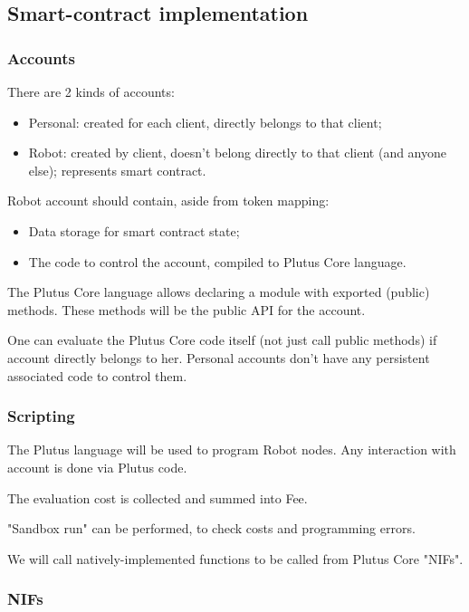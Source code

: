 \subsection{Smart-contract implementation}


\subsubsection{Accounts}

There are 2 kinds of accounts:
\begin{itemize}
  \item Personal: created for each client, directly belongs to that client;
  \item Robot: created by client, doesn't belong directly to that client (and anyone else); represents smart contract.
\end{itemize}

Robot account should contain, aside from token mapping:
\begin{itemize}
  \item Data storage for smart contract state;
  \item The code to control the account, compiled to Plutus Core language.
\end{itemize}

The Plutus Core language allows declaring a module with exported (public) methods.
These methods will be the public API for the account.

One can evaluate the Plutus Core code itself (not just call public methods) if account directly belongs to her.
Personal accounts don't have any persistent associated code to control them.

\subsubsection{Scripting}

The Plutus language will be used to program Robot nodes.
Any interaction with account is done via Plutus code.

The evaluation cost is collected and summed into Fee.

"Sandbox run" can be performed, to check costs and programming errors.

We will call natively-implemented functions to be called from Plutus Core "NIFs".

\subsubsection{NIFs}

